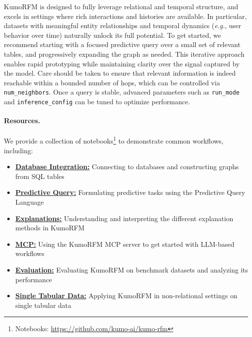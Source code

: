 \documentclass{article}
\newcommand{\name}{KumoRFM\xspace}
\begin{document}
\name is designed to fully leverage relational and temporal structure, and excels in settings where rich interactions and histories are available.
In particular, datasets with meaningful entity relationships and temporal dynamics (\emph{e.g.}, user behavior over time) naturally unlock its full potential.
To get started, we recommend starting with a focused predictive query over a small set of relevant tables, and progressively expanding the graph as needed.
This iterative approach enables rapid prototyping while maintaining clarity over the signal captured by the model.
Care should be taken to ensure that relevant information is indeed reachable within a bounded number of hops, which can be controlled via \texttt{num\_neighbors}.
Once a query is stable, advanced parameters such as \texttt{run\_mode} and \texttt{inference\_config} can be tuned to optimize performance.

\paragraph{Resources.}
We provide a collection of notebooks\footnote{Notebooks: \url{https://github.com/kumo-ai/kumo-rfm}} to demonstrate common workflows, including:
\begin{itemize}[label=\textcolor{kumo1}{\textbullet},leftmargin=10pt]
\item \textbf{\href{https://colab.research.google.com/drive/17UppPgwzLrjkGtUpGjcxOYDcbp7koFqd}{Database Integration:}} Connecting to databases and constructing graphs from SQL tables
\item \textbf{\href{https://colab.research.google.com/github/kumo-ai/kumo-rfm/blob/master/notebooks/predictive_query.ipynb}{Predictive Query:}} Formulating predictive tasks using the Predictive Query Language
\item \textbf{\href{https://colab.research.google.com/github/kumo-ai/kumo-rfm/blob/master/notebooks/explanations.ipynb}{Explanations:}} Understanding and interpreting the different explanation methods in \name
\item \textbf{\href{https://github.com/kumo-ai/kumo-rfm/blob/master/notebooks/ecom_agent.ipynb}{MCP:}} Using the \name MCP server to get started with LLM-based workflows
\item \textbf{\href{https://colab.research.google.com/github/kumo-ai/kumo-rfm/blob/master/notebooks/salt.ipynb}{Evaluation:}} Evaluating \name on benchmark datasets and analyzing its performance
\item \textbf{\href{https://colab.research.google.com/github/kumo-ai/kumo-rfm/blob/master/notebooks/single_table.ipynb}{Single Tabular Data:}} Applying \name in non-relational settings on single tabular data
\end{itemize}
\end{document}
